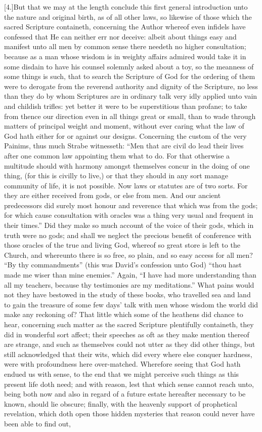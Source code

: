 [4.]But that we may at the length conclude this first general introduction unto the nature and original birth, as of all other laws, so likewise of those which the sacred Scripture containeth, concerning the Author whereof even infidels have confessed that He can neither err nor deceive: albeit about things easy and manifest unto all men by common sense there needeth no higher consultation; because as a man whose wisdom is in weighty affairs admired would take it in some disdain to have his counsel solemnly asked about a toy, so the meanness of some things is such, that to search the Scripture of God for the ordering of them were to derogate from the reverend authority and dignity of the Scripture, no less than they do by whom Scriptures are in ordinary talk very idly applied unto vain and childish trifles: yet better it were to be superstitious than profane; to take from thence our direction even in all things great or small, than to wade through matters of principal weight and moment, without ever caring what the law of God hath either for or against our designs. Concerning the custom of the very Painims, thus much Strabe witnesseth: “Men that are civil do lead their lives after one common law appointing them what to do. For that otherwise a multitude should with harmony amongst themselves concur in the doing of one thing, (for this is civilly to live,) or that they should in any sort manage community of life, it is not possible. Now laws or statutes are of two sorts. For they are either received from gods, or else from men.  And our ancient predecessors did surely most honour and reverence that which was from the gods; for which cause consultation with oracles was a thing very usual and frequent in their times.” Did they make so much account of the voice of their gods, which in truth were no gods; and shall we neglect the precious benefit of conference with those oracles of the true and living God, whereof so great store is left to the Church, and whereunto there is so free, so plain, and so easy access for all men? “By thy commandments” (this was David’s confession unto God) “thou hast made me wiser than mine enemies.” Again, “I have had more understanding than all my teachers, because thy testimonies are my meditations.” What pains would not they have bestowed in the study of these books, who travelled sea and land to gain the treasure of some few days’ talk with men whose wisdom the world did make any reckoning of? That little which some of the heathens did chance to hear, concerning such matter as the sacred Scripture plentifully containeth, they did in wonderful sort affect; their speeches as oft as they make mention thereof are strange, and such as themselves could not utter as they did other things, but still acknowledged that their wits, which did every where else conquer hardness, were with profoundness here over-matched. Wherefore seeing that God hath endued us with sense, to the end that we might perceive such things as this present life doth need; and with reason, lest that which sense cannot reach unto, being both now and also in regard of a future estate hereafter necessary to be known, should lie obscure; finally, with the heavenly support of prophetical revelation, which doth open those hidden mysteries that reason could never have been able to find out, 